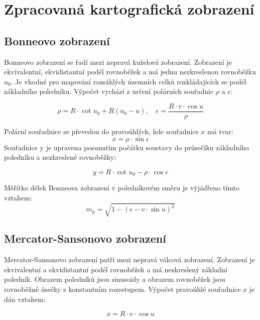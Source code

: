 \documentclass[12pt, a4paper]{article}
\begin{document}
\newpage
\section{Zpracovaná kartografická zobrazení}
\vspace{3mm}
\subsection*{Bonneovo zobrazení}
\vspace{3mm}
Bonneovo zobrazení se řadí mezi nepravá kuželová zobrazení. Zobrazení je ekvivalentní, ekvidistantní podél rovnoběžek a má jednu nezkreslenou rovnoběžku $u_0$. Je vhodné pro mapování rozsáhlých územních celků rozkládajících se podél základního poledníku. Výpočet vychází z určení polárních souřadnic $\rho$ a $\epsilon$:

\vspace{3mm}
\[
\rho = R \cdot \cot u_0 + R(u_0 - u), \quad \epsilon = \frac{R \cdot v \cdot \cos u}{\rho}
\]

\vspace{3mm}
\noindent Polární souřadnice se převedou do pravoúhlých, kde souřadnice $x$ má tvar:
\vspace{3mm}
\[
x = \rho \cdot \sin \epsilon
\]
\vspace{3mm}
\noindent Souřadnice y je upravena posunutím počátku soustavy do průsečíku základního poledníku a nezkreslené rovnoběžky:
\vspace{3mm}

\[
y = R \cdot \cot u_0 - \rho \cdot \cos \epsilon
\]
\vspace{3mm}

\noindent Měřítko délek Bonneova zobrazení v poledníkovém směru je výjádřeno tímto vztahem:
\vspace{3mm}
\[
m_p = \sqrt{1 - (\epsilon - v \cdot \sin u)^2}
\]

\subsection*{Mercator-Sansonovo zobrazení}
\vspace{3mm}
Mercator-Sansonovo zobrazení patří mezi nepravá válcová zobrazení. Zobrazení je ekvivalentní a ekvidistantní podél rovnoběžek a má nezkreslený základní poledník. Obrazem poledníků jsou sinusoidy a obrazem rovnoběžek jsou rovnoběžné úsečky s konstantním rozestupem. Výpočet pravoúhlé souřadnice $x$ je dán vztahem:

\vspace{3mm}
\[
x = R \cdot v \cdot \cos u
\]
\vspace{3mm}
\end{document}
